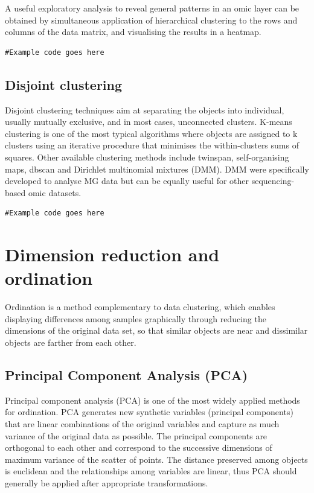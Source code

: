 \documentclass[
]{book}
\begin{document}
A useful exploratory analysis to reveal general patterns in an omic layer can be obtained by simultaneous application of hierarchical clustering to the rows and columns of the data matrix, and visualising the results in a heatmap.

\begin{verbatim}
#Example code goes here
\end{verbatim}

\hypertarget{disjoint-clustering}{%
\subsection{Disjoint clustering}\label{disjoint-clustering}}

Disjoint clustering techniques aim at separating the objects into individual, usually mutually exclusive, and in most cases, unconnected clusters. K-means clustering is one of the most typical algorithms where objects are assigned to k clusters using an iterative procedure that minimises the within-clusters sums of squares. Other available clustering methods include twinspan, self-organising maps, dbscan and Dirichlet multinomial mixtures (DMM). DMM were specifically developed to analyse MG data but can be equally useful for other sequencing-based omic datasets.

\begin{verbatim}
#Example code goes here
\end{verbatim}

\hypertarget{dimension-reduction-ordination}{%
\section{Dimension reduction and ordination}\label{dimension-reduction-ordination}}

Ordination is a method complementary to data clustering, which enables displaying differences among samples graphically through reducing the dimensions of the original data set, so that similar objects are near and dissimilar objects are farther from each other.

\hypertarget{pca}{%
\subsection{Principal Component Analysis (PCA)}\label{pca}}

Principal component analysis (PCA) is one of the most widely applied methods for ordination. PCA generates new synthetic variables (principal components) that are linear combinations of the original variables and capture as much variance of the original data as possible. The principal components are orthogonal to each other and correspond to the successive dimensions of maximum variance of the scatter of points. The distance preserved among objects is euclidean and the relationships among variables are linear, thus PCA should generally be applied after appropriate transformations.
\end{document}

